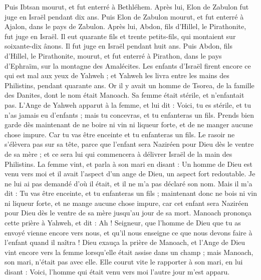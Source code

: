 \begin{multicols}{2}
Puis Ibtsan mourut, et fut enterré à Bethléhem.
Après lui, Elon de Zabulon fut juge en Israël pendant dix ans.
Puis Elon de Zabulon mourut, et fut enterré à Ajalon, dans le pays de Zabulon.
Après lui, Abdon, fils d'Hillel, le Pirathonite, fut juge en Israël.
Il eut quarante fils et trente petits-fils, qui montaient sur soixante-dix ânons. Il fut juge en  Israël pendant huit ans.
Puis Abdon, fils d'Hillel, le Pirathonite, mourut, et fut enterré à Pirathon, dans le pays d'Ephraïm, sur la montagne des Amalécites.
\VerseOne{}Les enfants d'Israël firent encore ce qui est mal aux yeux de Yahweh ; et Yahweh les livra entre les mains des Philistins, pendant quarante ans.
Or il y avait un homme de Tsorea, de la famille des Danites, dont le nom était Manoach. Sa femme était stérile, et n'enfantait pas.
L’Ange de Yahweh apparut à la femme, et lui dit : Voici, tu es stérile, et tu n'as jamais eu d'enfants ; mais tu concevras, et tu enfanteras un fils.
Prends bien garde dès maintenant de ne boire ni vin ni liqueur forte, et de ne manger aucune chose impure.
Car tu vas être enceinte et tu enfanteras un fils. Le rasoir ne s'élèvera pas sur sa tête, parce que l'enfant sera Naziréen pour Dieu dès le ventre de sa mère ; et ce sera lui qui commencera à délivrer Israël de la main des Philistins.
La femme vint, et parla à son mari en disant : Un homme de Dieu est venu vers moi et il avait l'aspect d'un ange de Dieu, un aspect fort redoutable. Je ne lui ai pas demandé d'où il était, et il ne m'a pas déclaré son nom.
Mais il m'a dit : Tu vas être enceinte, et tu enfanteras un fils ;  maintenant donc ne bois ni vin ni liqueur forte, et ne mange aucune chose impure, car cet enfant sera Naziréen pour Dieu dès le ventre de sa mère jusqu'au jour de sa mort.
Manoach prononça cette prière à Yahweh, et dit : Ah !  Seigneur, que l'homme de Dieu que tu as envoyé vienne encore vers nous, et qu'il nous enseigne ce que nous devons faire à l'enfant quand il naîtra !
Dieu exauça la prière de Manoach, et l'Ange de Dieu vint encore vers la femme lorsqu'elle était assise dans un champ ; mais Manoach, son mari, n'était pas avec elle.
Elle courut vite le rapporter à son mari, en lui disant : Voici, l'homme qui était venu vers moi l'autre jour m'est apparu.

\end{multicols}
